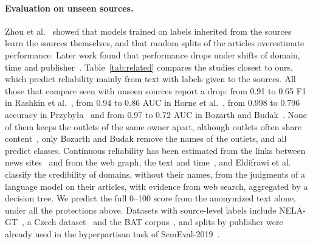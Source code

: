 \documentclass[11pt,a4paper]{article}
\begin{document}
\paragraph{Evaluation on unseen sources.} Zhou et al.~\cite{zhou2021hidden} showed that models trained on labels
inherited from the sources learn the sources themselves, and that random splits of the articles overestimate
performance. Later work found that performance drops under shifts of domain, time and
publisher~\cite{azizov-etal-2024-safari,burdisso-etal-2024-reliability,verhoeven2025yesterday}. Table~\ref{tab:related}
compares the studies closest to ours, which predict reliability mainly from text with labels given to the sources. All
those that compare seen with unseen sources report a drop: from 0.91 to 0.65 F1 in Rashkin et
al.~\cite{rashkin2017truth}, from 0.94 to 0.86 AUC in Horne et al.~\cite{horne2019robust}, from 0.998 to 0.796 accuracy
in Przyby{\l}a~\cite{przybyla2020capturing} and from 0.97 to 0.72 AUC in Bozarth and Budak~\cite{bozarth2020toward}.
None of them keeps the outlets of the same owner apart, although outlets often share
content~\cite{horne2019spirals,gruppi2021tell}, only Bozarth and Budak remove the names of the outlets, and all predict
classes. Continuous reliability has been estimated from the links between news
sites~\cite{burdisso-etal-2024-reliability} and from the web graph, the text and time~\cite{kondrup2026credibench}, and
Eldifrawi et al.~\cite{eldifrawi2026temporal} classify the credibility of domains, without their names, from the
judgments of a language model on their articles, with evidence from web search, aggregated by a decision tree. We
predict the full 0--100 score from the anonymized text alone, under all the protections above. Datasets with
source-level labels include NELA-GT~\cite{gruppi2021nela}, a Czech dataset~\cite{bohavcek2022fine} and the BAT
corpus~\cite{DBLP:journals/dbsk/AdjiLS26,batDataset}, and splits by publisher were already used in the hyperpartisan
task of SemEval-2019~\cite{kiesel2019semeval}.
\end{document}
